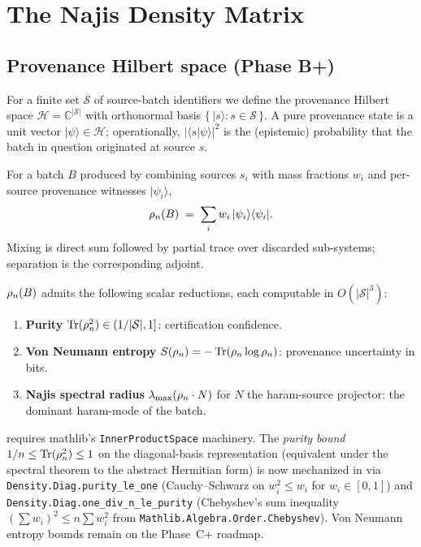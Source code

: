 \section{The Najis Density Matrix}
\label{sec:najis}

\subsection{Provenance Hilbert space (Phase B+)}

For a finite set $\mathcal{S}$ of source-batch identifiers we define the
provenance Hilbert space $\mathcal{H} = \mathbb{C}^{|\mathcal{S}|}$ with
orthonormal basis $\{\,|s\rangle : s \in \mathcal{S}\,\}$. A pure
provenance state is a unit vector $|\psi\rangle \in \mathcal{H}$;
operationally, $|\langle s | \psi\rangle|^2$ is the (epistemic)
probability that the batch in question originated at source $s$.

\begin{definition}
\label{def:rhon}
For a batch $B$ produced by combining sources $s_i$ with mass fractions
$w_i$ and per-source provenance witnesses $|\psi_i\rangle$,
\[
   \rho_{n}(B) \;=\; \sum_i w_i\, |\psi_i\rangle\langle\psi_i|.
\]
Mixing is direct sum followed by partial trace over discarded
sub-systems; separation is the corresponding adjoint.
\end{definition}

\begin{proposition}
\label{prop:diagnostics}
$\rho_{n}(B)$ admits the following scalar reductions, each computable in
$O(|\mathcal{S}|^3)$:
\begin{enumerate}[label=(\roman*)]
  \item \textbf{Purity} $\operatorname{Tr}(\rho_{n}^2) \in (1/|\mathcal{S}|, 1]$:
        certification confidence.
  \item \textbf{Von Neumann entropy} $S(\rho_{n}) = -\operatorname{Tr}(\rho_{n} \log \rho_{n})$:
        provenance uncertainty in bits.
  \item \textbf{Najis spectral radius} $\lambda_{\max}(\rho_{n} \cdot N)$
        for $N$ the haram-source projector: the dominant haram-mode of
        the batch.
\end{enumerate}
\end{proposition}

 requires mathlib's \texttt{InnerProductSpace}
machinery. The \emph{purity bound}
$1/n \leq \operatorname{Tr}(\rho_{n}^2) \leq 1$ on the diagonal-basis representation
(equivalent under the spectral theorem to the abstract Hermitian
form) is now mechanized in
 via
\texttt{Density.Diag.purity\_le\_one} (Cauchy--Schwarz on
$w_i^2 \leq w_i$ for $w_i \in [0,1]$) and
\texttt{Density.Diag.one\_div\_n\_le\_purity}
(Chebyshev's sum inequality
$(\sum w_i)^2 \leq n \sum w_i^2$ from
\texttt{Mathlib.Algebra.Order.Chebyshev}).
Von Neumann entropy bounds remain on the Phase~C+ roadmap.

